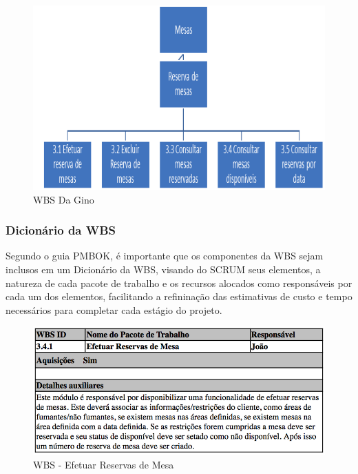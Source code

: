 \begin{figure}[H]
  \centering
  \includegraphics[width=1\textwidth]{softwareengineer/images/pmbok-dagino} 
  \caption{WBS Da Gino}
  \label{fig:pmbok-dagino} 
\end{figure}

\subsubsection{Dicionário da WBS}

Segundo o guia PMBOK, é importante que os componentes da WBS sejam inclusos em um Dicionário da WBS, visando do SCRUM seus elementos, a natureza de cada pacote de trabalho e os recursos alocados como responsáveis por cada um dos elementos, facilitando a refininação das estimativas de custo e tempo necessários para completar cada estágio do projeto.

\begin{figure}[H]
  \centering
  \includegraphics[width=1\textwidth]{softwareengineer/images/pmbok-wbs-341} 
  \caption{WBS - Efetuar Reservas de Mesa}
  \label{fig:pmbok-wbs-341} 
\end{figure}

